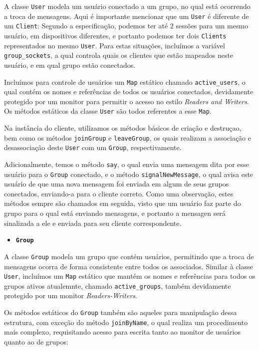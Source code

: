 \documentclass{article}
\begin{document}
A classe \texttt{User} modela um usuário conectado a um grupo, no qual está ocorrendo a troca de mensagens. Aqui é importante mencionar que um \texttt{User} é diferente de um \texttt{Client}: Segundo a especificação, podemos ter até 2 sessões para um mesmo usuário, em dispositivos diferentes, e portanto podemos ter dois \texttt{Clients} representados no mesmo \texttt{User}. Para estas situações, incluímos a variável \texttt{group\_sockets}, a qual controla quais os clientes que estão mapeados neste usuário, e em qual grupo estão conectados.
\par Incluímos para controle de usuários um \texttt{Map} estático chamado \texttt{active\_users}, o qual contém os nomes e referências de todos os usuários conectados, devidamente protegido por um monitor para permitir o acesso no estilo \textit{Readers and Writers}. Os métodos estáticos da classe \texttt{User} são todos referentes a esse \texttt{Map}.
\par Na instância do cliente, utilizamos os métodos básicos de criação e destruçao, bem como os métodos \texttt{joinGroup} e \texttt{leaveGroup}, os quais realizam a associação e desassociação deste \texttt{User} com um \texttt{Group}, respectivamente.
\par Adicionalmente, temos o método \texttt{say}, o qual envia uma mensagem dita por esse usuário para o \texttt{Group} conectado, e o método \texttt{signalNewMessage}, o qual avisa este usuário de que uma nova mensagem foi enviada em algum de seus grupos conectados, enviando-a para o cliente correto. Como uma observação, estes métodos sempre são chamados em seguida, visto que um usuário faz parte do grupo para o qual está enviando mensagens, e portanto a mensagen será sinalizada a ele e enviada para seu cliente correspondente.  
\begin{itemize}
    \item \textbf{\texttt{Group}}
\end{itemize}
A classe \texttt{Group} modela um grupo que contém usuários, permitindo que a troca de mensagens ocorra de forma consistente entre todos os associados. Similar à classe \texttt{User}, incluímos um \texttt{Map} estático que mantém os nomes e referências para todos os grupos ativos atualemnte, chamado \texttt{active\_groups}, também devidamente protegido por um monitor \textit{Readers-Writers}. 
\par Os métodos estáticos do \texttt{Group} também são aqueles para manipulação dessa estrutura, com exceção do método \texttt{joinByName}, o qual realiza um procedimento mais complexo, requisitando acesso para escrita tanto ao monitor de usuários quanto ao de grupos:
\end{document}
